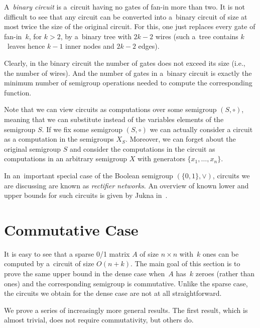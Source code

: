 \documentclass[11pt,letterpaper]{article}
\begin{document}
A~{\em binary circuit} is a~circuit having no gates of fan-in more than two. It
is not difficult to see that any circuit can be converted into a~binary circuit
of size at most twice the size of the original circuit. For this, one just
replaces every gate of fan-in~$k$, for $k>2$, by a~binary tree with $2k-2$ wires
(such a~tree contains $k$~leaves hence $k-1$ inner nodes and $2k-2$ edges).

Clearly, in the binary circuit the number of gates does not exceed its size
(i.e., the number of wires). And the number of gates in a~binary circuit is
exactly the minimum number of semigroup operations needed to compute the
corresponding function.

Note that we can view circuits as computations over some semigroup $(S,\circ)$,
meaning that we can substitute instead of the variables elements of the
semigroup $S$. If we fix some semigroup $(S,\circ)$ we can actually consider a
circuit as a computation in the semigroups $X_S$. Moreover, we can forget about
the original semigroup $S$ and consider the computations in the circuit as
computations in an arbitrary semigroup $X$ with generators
$\{x_1, \ldots, x_n\}$.

In an~important special case of the Boolean semigroup $(\{0,1\}, \lor)$,
circuits we are discussing are known as {\em rectifier networks}. An overview of
known lower and upper bounds for such circuits is given by Jukna
in~\cite[Section~13.6]{DBLP:books/daglib/0028687}.

\section{Commutative Case}\label{sec-commutative}
It is easy to see that a sparse 0/1 matrix $A$ of size $n \times n$ with~$k$
ones can be computed by a~circuit of size $O(n+k)$. The main goal of this
section is to prove the same upper bound in the dense case when~$A$ has~$k$
zeroes (rather than ones) and the corresponding semigroup is commutative. Unlike
the sparse case, the circuits we obtain for the dense case are not at all
straightforward.

We prove a series of increasingly more general results. The first result, which
is almost trivial, does not require commutativity, but others do.

\end{document}
